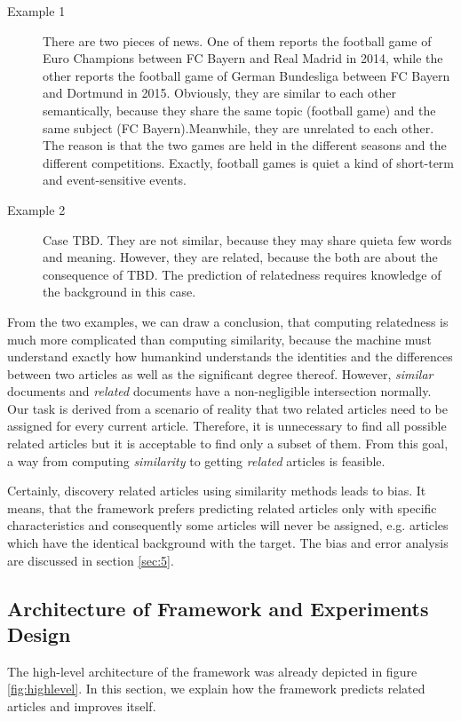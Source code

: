 \begin{description}
\item[Example 1] There are two pieces of news. One of them reports the football game of Euro Champions between FC Bayern and Real Madrid in 2014, while the other reports the football game of German Bundesliga between FC Bayern and Dortmund in 2015. Obviously, they are similar to each other semantically, because they share the same topic (football game) and the same subject (FC Bayern).Meanwhile, they are unrelated to each other. The reason is that the two games are held in the different seasons and the different competitions. Exactly, football games is quiet a kind of short-term and event-sensitive events. 
\item[Example 2] Case TBD. They are not similar, because they may share quieta few words and meaning. However, they are related, because the both are about the consequence of TBD. The prediction of relatedness requires knowledge of the background in this case.
\end{description}

From the two examples, we can draw a conclusion, that computing relatedness is much more complicated than computing similarity, because the machine must understand exactly how humankind understands the identities and the differences between two articles as well as the significant degree thereof. However, \textit{similar} documents and \textit{related} documents have a non-negligible intersection normally. Our task is derived from a scenario of reality that two related articles need to be assigned for every current article. Therefore, it is unnecessary to find all possible related articles but it is acceptable to find only a subset of them. From this goal, a way from computing \textit{similarity} to getting \textit{related} articles is feasible. 

Certainly, discovery related articles using similarity methods leads to bias. It means, that the framework prefers predicting related articles only with specific characteristics and consequently some articles will never be assigned, e.g. articles which have the identical background with the target. The bias and error analysis are discussed in section \ref{sec:5}. 

\subsection{Architecture of Framework and Experiments Design}
\label{sec:4.1}

The high-level architecture of the framework was already depicted in figure \ref{fig:highlevel}. In this section, we explain how the framework predicts related articles and improves itself. 

